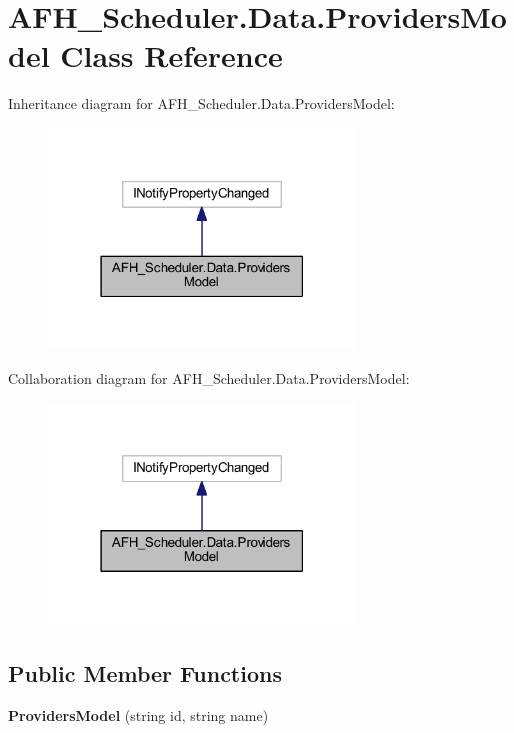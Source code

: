\section{A\+F\+H\+\_\+\+Scheduler.\+Data.\+Providers\+Model Class Reference}
\label{class_a_f_h___scheduler_1_1_data_1_1_providers_model}


Inheritance diagram for A\+F\+H\+\_\+\+Scheduler.\+Data.\+Providers\+Model\+:
\nopagebreak
\begin{figure}[H]
\begin{center}
\leavevmode
\includegraphics[width=231pt]{class_a_f_h___scheduler_1_1_data_1_1_providers_model__inherit__graph}
\end{center}
\end{figure}


Collaboration diagram for A\+F\+H\+\_\+\+Scheduler.\+Data.\+Providers\+Model\+:
\nopagebreak
\begin{figure}[H]
\begin{center}
\leavevmode
\includegraphics[width=231pt]{class_a_f_h___scheduler_1_1_data_1_1_providers_model__coll__graph}
\end{center}
\end{figure}
\subsection*{Public Member Functions}
\begin{DoxyCompactItemize}
\item 
\textbf{ Providers\+Model} (string id, string name)
\end{DoxyCompactItemize}
